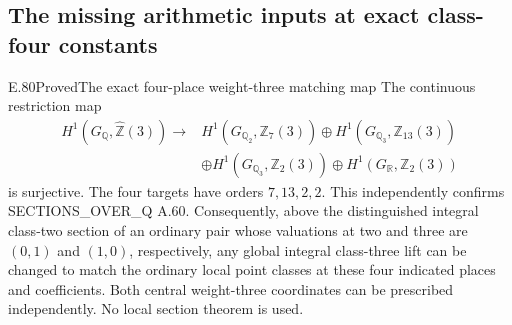 \subsection{The missing arithmetic inputs at exact class-four constants}

\begin{result}{E.80}{Proved}{The exact four-place weight-three matching map}
The continuous restriction map
\[
\begin{split}
 H^1(G_{\mathbb Q},\widehat{\mathbb Z}(3))\longrightarrow{}&
 H^1(G_{\mathbb Q_2},\mathbb Z_7(3))
 \oplus H^1(G_{\mathbb Q_3},\mathbb Z_{13}(3))\\
 &\oplus H^1(G_{\mathbb Q_3},\mathbb Z_2(3))
 \oplus H^1(G_{\mathbb R},\mathbb Z_2(3))
\end{split}
\tag{E.80.1}
\]
is surjective. The four targets have orders $7,13,2,2$.
This independently confirms SECTIONS\_OVER\_Q A.60.
Consequently, above the distinguished integral class-two
section of an ordinary pair whose valuations at two and three
are $(0,1)$ and $(1,0)$, respectively, any global integral
class-three lift can be changed to match the ordinary local
point classes at these four indicated places and coefficients.
Both central weight-three coordinates can be prescribed
independently. No local section theorem is used.
\end{result}
